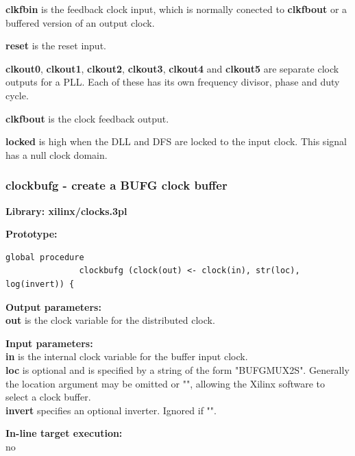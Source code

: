             {\bf clkfbin} is the feedback clock input, which is normally conected to
            {\bf clkfbout} or a buffered version of an output clock.

            {\bf reset} is the reset input.




                {\bf clkout0}, {\bf clkout1}, {\bf clkout2}, {\bf clkout3}, {\bf
                clkout4} and {\bf clkout5} are separate clock outputs for a PLL. Each
                of these has its own frequency divisor, phase and duty cycle.

                {\bf clkfbout} is the clock feedback output.

                {\bf locked} is high when the DLL and DFS are locked to the input
                clock. This signal has a null clock domain.


        \subsubsection{clockbufg - create a BUFG clock buffer}\label{sec:lpclockbufg}
            
            {\bf Library: xilinx/clocks.3pl}

            {\bf Prototype:} \\
            \vsp
            \begin{lstlisting}[gobble=12, language=threepl]
               global procedure
               clockbufg (clock(out) <- clock(in), str(loc), log(invert)) {
            \end{lstlisting}

            {\bf Output parameters:} \\
            {\bf out} is the clock variable for the distributed clock.

            {\bf Input parameters:} \\            
            {\bf in} is the internal clock variable for the buffer input
            clock.\\
            {\bf loc} is optional and is specified by a string of the form
            "BUFGMUX2S". Generally the location argument may be omitted or "",
            allowing the Xilinx software to select a clock buffer. \\
            {\bf invert} specifies an optional inverter. Ignored if "".
        
            {\bf In-line target execution:} \\
            no

